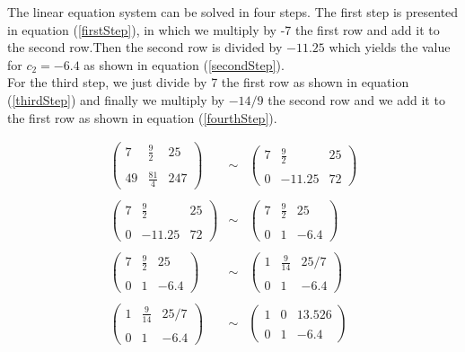 \documentclass[tikz, 12pt]{scrartcl}
\begin{document}
The linear equation system can be solved in four steps. The first step is presented in equation (\ref{firstStep}), in which we multiply by -7 the first row and add it to the second row.Then the second row is divided by $-11.25$ which yields the value for $c_2 = -6.4$ as shown in equation (\ref{secondStep}).\\
For the third step, we just divide by 7 the first row as shown in equation (\ref{thirdStep}) and finally we multiply by $-14/9$ the second row and we add it to the first row as shown in equation (\ref{fourthStep}).

\begin{eqnarray}
\left( 
\begin{array}{cc|c}
7	&	\frac{9}{2}		&	25\\
	&				&	\\
49	&	\frac{81}{4}	&	247
\end{array}
\right)
&
\sim
&
\left( 
\begin{array}{cc|c}
7	&	\frac{9}{2}		&	25\\
	&				&\\
0	&	-11.25	&	72
\end{array}
\right) \label{firstStep}\\
\nonumber
\\
\left( 
\begin{array}{cc|c}
7	&	\frac{9}{2}		&	25\\
	&				&\\
0	&	-11.25	&	72
\end{array}
\right) 
&
\sim
&
\left( 
\begin{array}{cc|c}
7	&	\frac{9}{2}		&	25\\
	&				&\\
0	&	1			&	-6.4
\end{array}
\right) \label{secondStep}\\
\nonumber
\\
\left( 
\begin{array}{cc|c}
7	&	\frac{9}{2}		&	25\\
	&				&\\
0	&	1			&	-6.4
\end{array}
\right)
&
\sim
&
\left( 
\begin{array}{cc|c}
1	&	\frac{9}{14}		&	25/7\\
	&				&\\
0	&	1			&	-6.4
\end{array}
\right) \label{thirdStep}\\
\nonumber
\\
\left( 
\begin{array}{cc|c}
1	&	\frac{9}{14}		&	25/7\\
	&				&\\
0	&	1			&	-6.4
\end{array}
\right) 
&
\sim
&
\left( 
\begin{array}{cc|c}
1	&	0		&	13.526\\
	&				&\\
0	&	1			&	-6.4
\end{array}
\right) \label{fourthStep}
\end{eqnarray}
\end{document}
